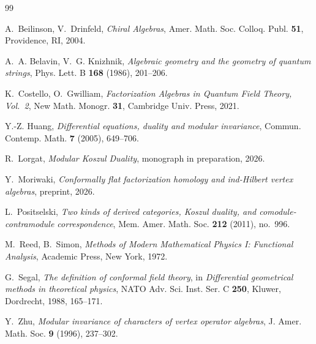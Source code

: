 \documentclass[11pt,reqno]{amsart}
\theoremstyle{definition}
\theoremstyle{remark}
\numberwithin{equation}{section}
\begin{document}
\begin{thebibliography}{99}

A.~Beilinson, V.~Drinfeld,
\emph{Chiral Algebras},
Amer. Math. Soc. Colloq. Publ. \textbf{51},
Providence, RI, 2004.

A.~A. Belavin, V.~G. Knizhnik,
\emph{Algebraic geometry and the geometry of quantum strings},
Phys. Lett. B \textbf{168} (1986), 201--206.

K.~Costello, O.~Gwilliam,
\emph{Factorization Algebras in Quantum Field Theory, Vol.~2},
New Math. Monogr. \textbf{31}, Cambridge Univ. Press, 2021.

Y.-Z. Huang,
\emph{Differential equations, duality and modular invariance},
Commun. Contemp. Math. \textbf{7} (2005), 649--706.

R.~Lorgat,
\emph{Modular Koszul Duality},
monograph in preparation, 2026.

Y.~Moriwaki,
\emph{Conformally flat factorization homology and ind-Hilbert
vertex algebras},
preprint, 2026.

L.~Positselski,
\emph{Two kinds of derived categories, Koszul duality, and
comodule-contramodule correspondence},
Mem. Amer. Math. Soc. \textbf{212} (2011), no.~996.

M.~Reed, B.~Simon,
\emph{Methods of Modern Mathematical Physics I: Functional
Analysis},
Academic Press, New York, 1972.

G.~Segal,
\emph{The definition of conformal field theory},
in \emph{Differential geometrical methods in theoretical
physics}, NATO Adv. Sci. Inst. Ser. C \textbf{250}, Kluwer,
Dordrecht, 1988, 165--171.

Y.~Zhu,
\emph{Modular invariance of characters of vertex operator
algebras},
J. Amer. Math. Soc. \textbf{9} (1996), 237--302.

\end{thebibliography}
\end{document}
